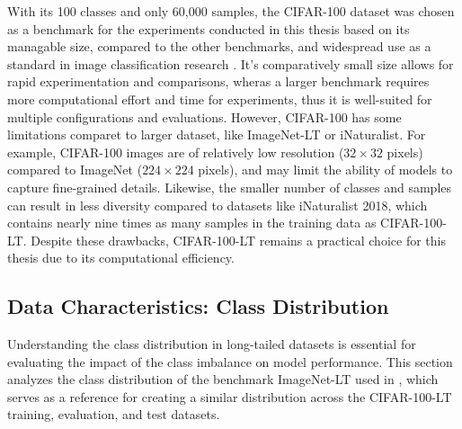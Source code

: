With its 100 classes and only 60,000 samples, the CIFAR-100 dataset was chosen as a benchmark for the experiments conducted in this thesis based on its managable size, compared to the other benchmarks, and widespread use as a standard in image classification research . It's comparatively small size allows for rapid experimentation and comparisons, wheras a larger benchmark requires more computational effort and time for experiments, thus it is well-suited for multiple configurations and evaluations. However, CIFAR-100 has some limitations comparet to larger dataset, like ImageNet-LT or iNaturalist. For example, CIFAR-100 images are of relatively low resolution ($32 \times 32$ pixels) compared to ImageNet ($224 \times 224$ pixels), and may limit the ability of models to capture fine-grained details. Likewise, the smaller number of classes and samples can result in less diversity compared to datasets like iNaturalist 2018, which contains nearly nine times as many samples in the training data as CIFAR-100-LT. Despite these drawbacks, CIFAR-100-LT remains a practical choice for this thesis due to its computational efficiency. 


\subsection{Data Characteristics: Class Distribution}

Understanding the class distribution in long-tailed datasets is essential for evaluating the impact of the class imbalance on model performance. This section analyzes the class distribution of the benchmark ImageNet-LT used in \cite{zhang2023deep}, which serves as a reference for creating a similar distribution across the CIFAR-100-LT training, evaluation, and test datasets.  

